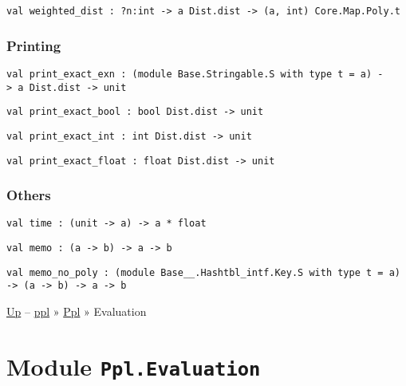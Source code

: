 \protect\hyperlink{val-weightedux5fdist}{}\texttt{val\ weighted\_dist\ :\ ?⁠n:int\ -\textgreater{}\ \textquotesingle{}a\ Dist.dist\ -\textgreater{}\ (\textquotesingle{}a,~int)\ Core.Map.Poly.t}

\hypertarget{print}{\subsubsection{\texorpdfstring{\protect\hyperlink{print}{}Printing}{Printing}}\label{print}}

\protect\hyperlink{val-printux5fexactux5fexn}{}\texttt{val\ print\_exact\_exn\ :\ (module\ Base.Stringable.S\ with\ type\ t\ =\ \textquotesingle{}a)\ -\textgreater{}\ \textquotesingle{}a\ Dist.dist\ -\textgreater{}\ unit}

\protect\hyperlink{val-printux5fexactux5fbool}{}\texttt{val\ print\_exact\_bool\ :\ bool\ Dist.dist\ -\textgreater{}\ unit}

\protect\hyperlink{val-printux5fexactux5fint}{}\texttt{val\ print\_exact\_int\ :\ int\ Dist.dist\ -\textgreater{}\ unit}

\protect\hyperlink{val-printux5fexactux5ffloat}{}\texttt{val\ print\_exact\_float\ :\ float\ Dist.dist\ -\textgreater{}\ unit}

\hypertarget{otherux5fhelpers}{\subsubsection{\texorpdfstring{\protect\hyperlink{otherux5fhelpers}{}Others}{Others}}\label{otherux5fhelpers}}

\protect\hyperlink{val-time}{}\texttt{val\ time\ :\ (unit\ -\textgreater{}\ \textquotesingle{}a)\ -\textgreater{}\ \textquotesingle{}a\ *\ float}

\protect\hyperlink{val-memo}{}\texttt{val\ memo\ :\ (\textquotesingle{}a\ -\textgreater{}\ \textquotesingle{}b)\ -\textgreater{}\ \textquotesingle{}a\ -\textgreater{}\ \textquotesingle{}b}

\protect\hyperlink{val-memoux5fnoux5fpoly}{}\texttt{val\ memo\_no\_poly\ :\ (module\ Base\_\_.Hashtbl\_intf.Key.S\ with\ type\ t\ =\ \textquotesingle{}a)\ -\textgreater{}\ (\textquotesingle{}a\ -\textgreater{}\ \textquotesingle{}b)\ -\textgreater{}\ \textquotesingle{}a\ -\textgreater{}\ \textquotesingle{}b}

\href{../index.html}{Up} -- \href{../../index.html}{ppl} »
\href{../index.html}{Ppl} » Evaluation

\section{\texorpdfstring{Module
\texttt{Ppl.Evaluation}}{Module Ppl.Evaluation}}\label{module-ppl.evaluation}

